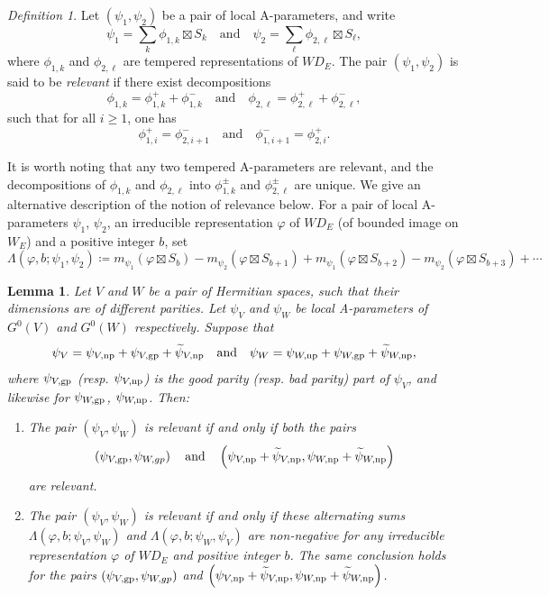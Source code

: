 \documentclass[11pt,letterpaper]{amsart}
\theoremstyle{plain}
\newcounter{theorem}[section]
\numberwithin{theorem}{section}
\numberwithin{equation}{subsection}
\newtheorem{Lem}[theorem]{Lemma}
\theoremstyle{remark}
\newtheorem{Def}[theorem]{Definition}
\def\gp{{\rm gp}} %
\def\np{{\rm np}} %
\begin{document}
\begin{Def}\label{D:relevance-definition}
Let $\left(\psi_1,\psi_2\right)$ be a pair of local A-parameters, and write
\[
    \psi_1 = \sum_k \phi_{1,k} \boxtimes S_k \quad \text{and} \quad \psi_2 = \sum_\ell \phi_{2,\ell}\boxtimes S_\ell,
\]
where $\phi_{1,k}$ and  $\phi_{2,\ell}$ are tempered representations of $WD_E$. The pair $\left(\psi_1,\psi_2\right)$ is said to be \emph{relevant} if there exist decompositions
\[  
    \phi_{1,k}=\phi_{1,k}^+ + \phi_{1,k}^- \quad \text{and} \quad \phi_{2,\ell}=\phi_{2,\ell}^+ + \phi_{2,\ell}^-,
\]
such that for all $i\geq 1$, one has
\[  
    \phi_{1,i}^+=\phi_{2,i+1}^-\quad \text{and} \quad \phi_{1,i+1}^-=\phi_{2,i}^+.
\]
\end{Def}

\vskip 5pt

It is worth noting that any two tempered A-parameters are relevant, and the decompositions of $\phi_{1,k}$ and $\phi_{2,\ell}$ into $\phi_{1,k}^\pm$ and $\phi_{2,\ell}^\pm$ are unique. We give an alternative description of the notion of relevance below. For a pair of local A-parameters $\psi_1$, $\psi_2$, an irreducible representation $\varphi$ of $WD_E$ (of bounded image on $W_E$) and a positive integer $b$, set
\[
    \Lambda\left(\varphi,b;\psi_1,\psi_2\right) \coloneqq m_{\psi_1}\left(\varphi\boxtimes S_b\right) - m_{\psi_2}\left(\varphi\boxtimes S_{b+1}\right) + m_{\psi_1}\left(\varphi\boxtimes S_{b+2}\right) - m_{\psi_2}\left(\varphi\boxtimes S_{b+3}\right) + \cdots
\]

\begin{Lem}\label{L:AlterDescriptionRelevance}
Let $V$ and $W$ be a pair of Hermitian spaces, such that their dimensions are of different parities. Let $\psi_V$ and $\psi_W$ be local A-parameters of $G^0\left(V\right)$ and $G^0\left(W\right)$ respectively. Suppose that
\[
    \psi_V = \psi_{V,\np} + \psi_{V,\gp} + \widetilde{\psi}_{V,\np} \quad \text{and} \quad \psi_W = \psi_{W,\np} + \psi_{W,\gp} + \widetilde{\psi}_{W,\np},
\]
where $\psi_{V,\gp}$ (resp. $\psi_{V,\np}$) is the good parity (resp. bad parity) part of $\psi_V$, and likewise for $\psi_{W,\gp}$, $\psi_{W,\np}$. Then:
\begin{enumerate}
    \item The pair $\left(\psi_V, \psi_W\right)$ is relevant if and only if both the pairs
\[
    \left(\psi_{V,\gp}, \psi_{W,gp}\right)\quad \text{and} \quad\left(\psi_{V,\np} + \widetilde{\psi}_{V,\np}, \psi_{W,\np} + \widetilde{\psi}_{W,\np}\right)
\]
    are relevant.

    \vskip 5pt

    \item The pair $\left(\psi_V, \psi_W\right)$ is relevant if and only if these alternating sums $\Lambda\left(\varphi,b;\psi_V,\psi_W\right)$ and $\Lambda\left(\varphi,b;\psi_W,\psi_V\right)$ are non-negative for any irreducible representation $\varphi$ of $WD_E$ and positive integer $b$. The same conclusion holds for the pairs $\left(\psi_{V,\gp}, \psi_{W,gp}\right)$ and $\left(\psi_{V,\np} + \widetilde{\psi}_{V,\np}, \psi_{W,\np} + \widetilde{\psi}_{W,\np}\right)$.
\end{enumerate}
\end{Lem}
\end{document}
